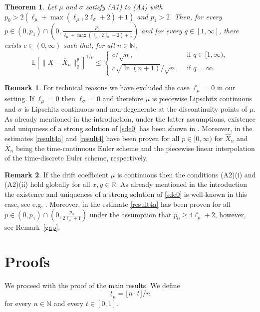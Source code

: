 \documentclass[11pt]{amsart}
\newcommand{\R}{{\mathbb R}}
\newcommand{\N}{{\mathbb N}}
\newcommand{\EE}{{\mathbb E}}
\newcommand{\utn}{\underline {t}_n}
\theoremstyle{plain}
\newtheorem{theorem}{Theorem}
\theoremstyle{definition}
\newtheorem{rem}{Remark}
\begin{document}
\begin{theorem}\label{Thm2}\mbox{}
		 Let $\mu$ and $\sigma$ satisfy (A1) to (A4) with $p_0 > 2(\ell_\mu +  \max(\ell_\mu, 2\ell_\sigma +2)+ 1)$ and $p_1>2$.
		Then, for every $p\in (0,p_1)\cap (0,\frac{p_0}{\ell_\mu +  \max(\ell_\mu, 2\ell_\sigma +2)+ 1})$ and for every $q\in [1,\infty]$,
		there exists $c\in (0,\infty)$ such that, for all $n\in\N$,
		\begin{equation}\label{result4}
			\EE[ \|X-\overline X_n    \|_q^p]^{1/p}	\le  \begin{cases} c/\sqrt{n}, &\text{ if }q\in [1,\infty), \\
				c \sqrt{\ln (n+1)}/\sqrt{n} , &\text{ if }q=\infty.
			\end{cases}
		\end{equation}	
\end{theorem}

\begin{rem}
 For technical reasons
 we have excluded
  the case $\ell_\mu=0$ in our setting. If $\ell_\mu=0$
 then $\ell_\sigma=0$  and therefore
 $\mu$ is piecewise Lipschitz continuous and $\sigma$ is Lipschitz continuous and non-degenerate at the discontinuity points of $\mu$. As already mentioned in the introduction, under the latter assumptions,  existence and uniquness of a strong solution of \eqref{sde0} has been shown in \cite{LS16}. Moreover, in \cite{MGY20} the estimates \eqref{result4a} and \eqref{result4} have been proven for all $p\in[0, \infty)$ for $\widehat X_n$ and $\overline X_n$ being the time-continuous Euler scheme and the piecewise linear interpolation of the time-discrete  Euler scheme, respectively.
 \end{rem}

\begin{rem}
	If the drift coefficient $\mu$ is  continuous then the conditions (A2)(i) and (A2)(ii)  hold globally for all $x,y\in \R$.
	As already mentioned in the introduction the existence and uniqueness of a strong solution of \eqref{sde0} is well-known in this case, see e.g. \cite[Theorem 3.1.1]{PrevotRoeckner2007}. Moreover, in \cite{Sabanis2016} the estimate \eqref{result4a}  has been proven for all  $p\in(0, p_1)\cap (0,\frac{p_0}{2\ell_\mu +1})$ under the assumption that $p_0\geq 4\ell_\mu+2$,
	however, see Remark~\ref{gap}.
\end{rem}

\section{Proofs}\label{Proofs}\label{s4}
We proceed with the proof of the main results. We define
\[
\utn = \lfloor n\cdot t\rfloor / n
\]
for every $n\in\N$ and every $t\in [0,1]$.
\end{document}
